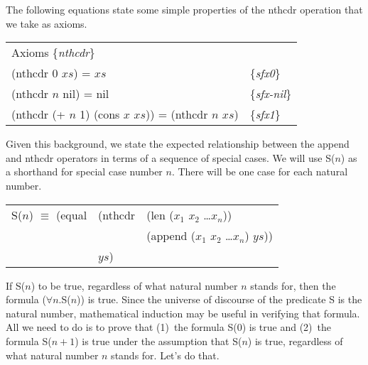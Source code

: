 The following equations state some simple properties of the nthcdr operation that we take as axioms.

\label{nthcdr-equations}
\begin{center}
\begin{tabular}{ll}
Axioms \{\emph{nthcdr}\}                               &                     \\
(nthcdr 0 $xs$) = $xs$                                 & \{\emph{sfx0}\}     \\
(nthcdr $n$ nil) =  nil                                & \{\emph{sfx-nil}\}  \\
(nthcdr (+ $n$ 1) (cons $x$ $xs$)) = (nthcdr $n$ $xs$) & \{\emph{sfx1}\}     \\
\end{tabular}
\end{center}



Given this background, we state the expected relationship between the append and nthcdr operators in terms of a sequence of special cases. We will use S($n$) as a shorthand for special case number $n$. There will be one case for each natural number.

\begin{center}
\begin{tabular}{lll}
S($n$) $\equiv$ (equal & (nthcdr & (len ($x_1$ $x_2$ \dots $x_n$))          \\
                       &         & (append ($x_1$ $x_2$ \dots $x_n$) $ys$)) \\
                       & $ys$)   &                                          \\
\end{tabular}
\end{center}

 If S($n$) to be true, regardless of what natural number $n$ stands for, then the formula ($\forall$$n$.S($n$)) is true. Since the universe of discourse of the predicate S is the natural number, mathematical induction may be useful in verifying that formula. All we need to do is to prove that (1)~the formula S(0) is true and (2)~the formula S($n+1$) is true under the assumption that S($n$) is true, regardless of what natural number $n$ stands for. Let's do that.

